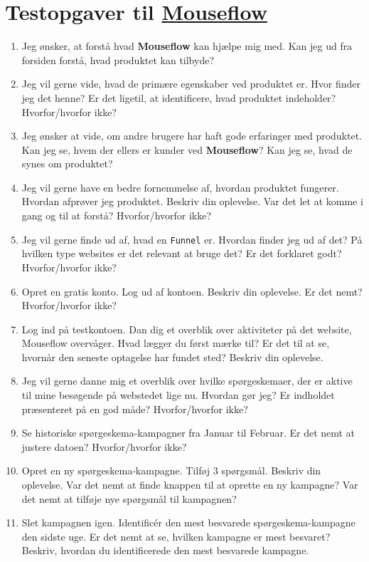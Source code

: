 \documentclass{article}
\begin{document}
\section*{Testopgaver til \href{http://mouseflow.com}{Mouseflow}}
\begin{enumerate}

\item Jeg ønsker, at forstå hvad \textbf{Mouseflow} kan hjælpe mig med. Kan jeg ud fra forsiden forstå, hvad produktet kan tilbyde?
\item Jeg vil gerne vide, hvad de primære egenskaber ved produktet er. Hvor finder jeg det henne? Er det ligetil, at identificere, hvad produktet indeholder? Hvorfor/hvorfor ikke?
\item Jeg ønsker at vide, om andre brugere har haft gode erfaringer med produktet. Kan jeg se, hvem der ellers er kunder ved \textbf{Mouseflow}? Kan jeg se, hvad de synes om produktet?
\item Jeg vil gerne have en bedre fornemmelse af, hvordan produktet fungerer. Hvordan afprøver jeg produktet. Beskriv din oplevelse. Var det let at komme i gang og til at forstå? Hvorfor/hvorfor ikke?
\item Jeg vil gerne finde ud af, hvad en \texttt{Funnel} er. Hvordan finder jeg ud af det? På hvilken type websites er det relevant at bruge det? Er det forklaret godt? Hvorfor/hvorfor ikke?

\item Opret en gratis konto. Log ud af kontoen. Beskriv din oplevelse. Er det nemt? Hvorfor/hvorfor ikke?
\item Log ind på testkontoen. Dan dig et overblik over aktiviteter på det website, Mouseflow overvåger. Hvad lægger du først mærke til? Er det til at se, hvornår den seneste optagelse har fundet sted? Beskriv din oplevelse.

\item Jeg vil gerne danne mig et overblik over hvilke spørgeskemaer, der er aktive til mine besøgende på webstedet lige nu. Hvordan gør jeg? Er indholdet præsenteret på en god måde? Hvorfor/hvorfor ikke?
\item Se historiske spørgeskema-kampagner fra Januar til Februar. Er det nemt at justere datoen? Hvorfor/hvorfor ikke?
\item Opret en ny spørgeskema-kampagne. Tilføj 3 spørgsmål. Beskriv din oplevelse. Var det nemt at finde knappen til at oprette en ny kampagne? Var det nemt at tilføje nye spørgsmål til kampagnen? 
\item Slet kampagnen igen. Identificér den mest besvarede spørgeskema-kampagne den sidste uge. Er det nemt at se, hvilken kampagne er mest besvaret? Beskriv, hvordan du identificerede den mest besvarede kampagne.


\end{enumerate}
\end{document}
